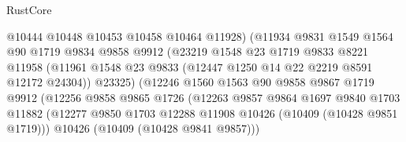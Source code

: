\begin{lexlean}{RustCore}
\begin{coremodule}
                                    @10444
                                    @10448
                                    @10453
                                    @10458
                                    @10464
                                    @11928)
                                  (@11934
                                    @9831
                                    @1549
                                    @1564
                                    @90
                                    @1719
                                    @9834
                                    @9858
                                    @9912
                                    (@23219
                                      @1548
                                      @23
                                      @1719
                                      @9833
                                      @8221
                                      @11958
                                      (@11961
                                        @1548
                                        @23
                                        @9833
                                        (@12447 @1250 @14 @22 @2219 @8591 @12172 @24304))
                                      @23325)
                                    (@12246
                                      @1560
                                      @1563
                                      @90
                                      @9858
                                      @9867
                                      @1719
                                      @9912
                                      (@12256
                                        @9858
                                        @9865
                                        @1726
                                        (@12263
                                          @9857
                                          @9864
                                          @1697
                                          @9840
                                          @1703
                                          @11882
                                          (@12277
                                            @9850
                                            @1703
                                            @12288
                                            @11908
                                            @10426
                                            (@10409 (@10428 @9851 @1719)))
                                          @10426
                                          (@10409 (@10428 @9841 @9857)))

\end{coremodule}
\end{lexlean}
